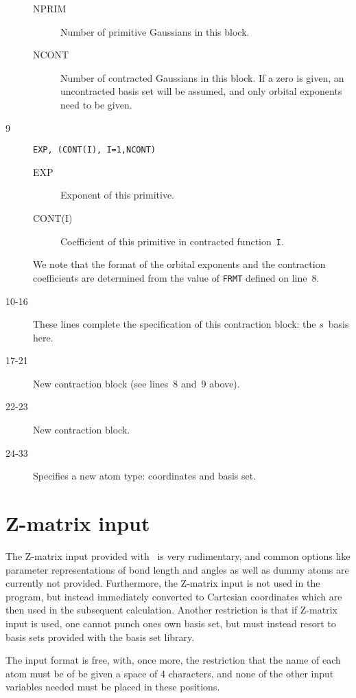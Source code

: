 \begin{description}
\begin{description}
\item[NPRIM] Number of primitive
Gaussians in this block.
\item[NCONT] Number of contracted
Gaussians in this block. If a zero
is given, an uncontracted basis set will be assumed, and only orbital
exponents need to be given.
\end{description}
\item[9] \verb|EXP, (CONT(I), I=1,NCONT)|
\begin{description}
\item[EXP] Exponent of this primitive.
\item[CONT(I)] Coefficient of this primitive in contracted
function~{\tt I}.
\end{description}
We note that the format of the orbital exponents and the contraction
coefficients are determined from the value of {\tt FRMT} defined on
line~8.
\item[10-16] These lines complete the specification of this
contraction block: the $s$~basis here.
\item[17-21] New contraction block (see lines~8 and~9 above).
\item[22-23] New contraction block.
\item[24-33] Specifies a new atom type: coordinates and basis set.
\end{description}

\section{Z-matrix input}\label{sec:molzmat}

The Z-matrix input provided with \siraba\ is
very rudimentary, and
common options like parameter representations of bond length and
angles as well as dummy atoms are currently not provided. Furthermore,
the Z-matrix input is not used in the program, but instead immediately
converted to Cartesian coordinates which are then used in the
subsequent calculation.
Another restriction is that if Z-matrix input is used, one cannot
punch ones own basis set, but must instead resort to basis sets
provided with the basis set library.

The input format is free, with, once more,
the restriction that the name of each atom must be of be given a space
of 4 characters, and none of the other input variables needed must be
placed in these positions.

